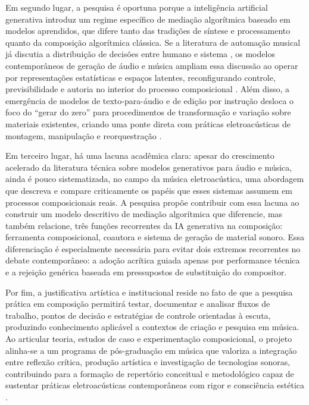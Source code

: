 Em segundo lugar, a pesquisa é oportuna porque a inteligência artificial generativa introduz um regime específico de mediação algorítmica baseado em modelos aprendidos, que difere tanto das tradições de síntese e processamento quanto da composição algorítmica clássica. Se a literatura de automação musical já discutia a distribuição de decisões entre humano e sistema \cite{nierhaus2009algorithmiccomposition,cope1996emi}, os modelos contemporâneos de geração de áudio e música ampliam essa discussão ao operar por representações estatísticas e espaços latentes, reconfigurando controle, previsibilidade e autoria no interior do processo composicional \cite{oord2016wavenet,oord2017vqvae,engel2020ddsp,copet2023musicgen}. Além disso, a emergência de modelos de texto-para-áudio e de edição por instrução desloca o foco do ``gerar do zero'' para procedimentos de transformação e variação sobre materiais existentes, criando uma ponte direta com práticas eletroacústicas de montagem, manipulação e reorquestração \cite{liu2023audioldm2,tsai2024apadapter,ghosal2023tango}.

Em terceiro lugar, há uma lacuna acadêmica clara: apesar do crescimento acelerado da literatura técnica sobre modelos generativos para áudio e música, ainda é pouco sistematizada, no campo da música eletroacústica, uma abordagem que descreva e compare criticamente os papéis que esses sistemas assumem em processos composicionais reais. A pesquisa propõe contribuir com essa lacuna ao construir um modelo descritivo de mediação algorítmica que diferencie, mas também relacione, três funções recorrentes da IA generativa na composição: ferramenta composicional, coautora e sistema de geração de material sonoro. Essa diferenciação é especialmente necessária para evitar dois extremos recorrentes no debate contemporâneo: a adoção acrítica guiada apenas por performance técnica e a rejeição genérica baseada em pressupostos de substituição do compositor.

Por fim, a justificativa artística e institucional reside no fato de que a pesquisa prática em composição permitirá testar, documentar e analisar fluxos de trabalho, pontos de decisão e estratégias de controle orientadas à escuta, produzindo conhecimento aplicável a contextos de criação e pesquisa em música. Ao articular teoria, estudos de caso e experimentação composicional, o projeto alinha-se a um programa de pós-graduação em música que valoriza a integração entre reflexão crítica, produção artística e investigação de tecnologias sonoras, contribuindo para a formação de repertório conceitual e metodológico capaz de sustentar práticas eletroacústicas contemporâneas com rigor e consciência estética \cite{emmerson1986language,roads1996computermusictutorial,wishart1996sonicart}.

